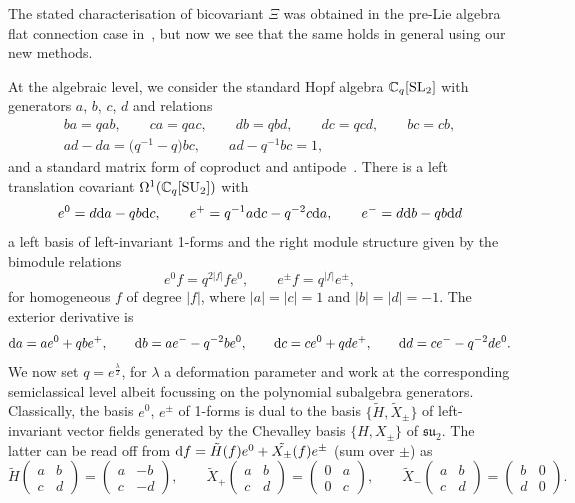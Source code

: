 \documentclass[10pt,a4paper]{amsart}
\numberwithin{equation}{section}
\newcommand{\<}{{\langle}}
\renewcommand{\>}{{\rangle}}
\newcommand{\extd}{{\rm d}}
\begin{document}
The stated characterisation of bicovariant $\Xi$ was obtained in the pre-Lie algebra flat connection case in~\cite{MaTao:plg}, but now we see that the same holds in general using our new methods.

\begin{Example}\label{exSU2} At the algebraic level, we consider the standard Hopf algebra $\mathbb{C}_q[{\rm SL}_2]$ with generators $a$, $b$, $c$, $d$ and relations
\begin{gather*} ba=qab, \qquad ca=qac, \qquad db=qbd, \qquad dc=qcd, \qquad bc=cb, \\
 ad-da=\big(q^{-1}-q\big)bc, \qquad ad-q^{-1}bc=1, \end{gather*} and a standard matrix form of coproduct and antipode~\cite{Ma:book}. There is a left translation covariant $\Omega^1(\mathbb{C}_q[{\rm SU}_2])$ with~\cite{Wor}
\[ e^0=d\extd a-qb\extd c,\qquad e^+=q^{-1}a\extd c-q^{-2}c\extd a,\qquad e^-=d\extd b-qb\extd d \]
a left basis of left-invariant 1-forms and the right module structure given by the bimodule relations
\[ e^0f=q^{2|f|}fe^0, \qquad e^{\pm}f=q^{|f|}e^{\pm},\]
for homogeneous $f$ of degree $|f|$, where $|a|=|c|=1$ and $|b|=|d|=-1$. The exterior derivative is
\[ \extd a=ae^0+qbe^+,\qquad \extd b=ae^--q^{-2}be^0,\qquad \extd c=ce^0+qde^+,\qquad \extd d=ce^--q^{-2}de^0.\]
We now set $q=e^{\frac{\lambda}{2}}$, for $\lambda$ a deformation parameter and work at the corresponding semiclassical level albeit focussing on the polynomial subalgebra generators. Classically, the basis $e^0$, $e^\pm$ of 1-forms is dual to the basis $\big\{\tilde H,\tilde X_\pm\big\}$ of left-invariant vector fields generated by the Chevalley basis $\lbrace H,X_{\pm}\rbrace$ of $\mathfrak{su}_2$. The latter can be read off from $\extd f=\tilde{H}(f)e^0+\tilde{X_\pm}(f)e^\pm$ (sum over $\pm$) as
\[ \tilde H\begin{pmatrix} a & b \\ c & d \end{pmatrix}=\begin{pmatrix} a & -b \\ c & -d \end{pmatrix},\qquad \tilde X_+\begin{pmatrix} a & b \\ c & d \end{pmatrix}=\begin{pmatrix} 0 & a \\ 0 & c \end{pmatrix},\qquad \tilde X_-\begin{pmatrix} a & b \\ c & d \end{pmatrix}=\begin{pmatrix} b & 0 \\ d & 0 \end{pmatrix}. \]

\end{Example}
\end{document}
